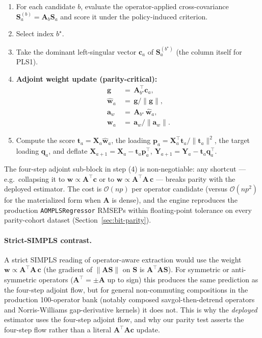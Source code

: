 \documentclass[review,a4paper]{elsarticle}
\newcommand{\Xmat}{\mathbf{X}}
\newcommand{\Ymat}{\mathbf{Y}}
\newcommand{\Amat}{\mathbf{A}}
\newcommand{\Smat}{\mathbf{S}}
\newcommand{\wvec}{\mathbf{w}}
\newcommand{\tvec}{\mathbf{t}}
\newcommand{\pvec}{\mathbf{p}}
\newcommand{\qvec}{\mathbf{q}}
\newcommand{\cvec}{\mathbf{c}}
\newcommand{\gvec}{\mathbf{g}}
\newcommand{\avec}{\mathbf{a}}
\newcommand{\SIMPLS}{\textsc{SIMPLS}\xspace}
\begin{document}
\begin{enumerate}[leftmargin=2em]
  \item For each candidate $b$, evaluate the operator-applied
        cross-covariance $\Smat_a^{(b)}=\Amat_b\Smat_a$ and score
        it under the policy-induced criterion.
  \item Select index $b^\star$.
  \item Take the dominant left-singular vector $\cvec_a$ of
        $\Smat_a^{(b^\star)}$ (the column itself for PLS1).
  \item \textbf{Adjoint weight update (parity-critical):}
        \begin{align*}
        \gvec      &\,=\, \Amat_{b^\star}^\top \cvec_a, \\
        \hat{\wvec}_a &\,=\, \gvec / \|\gvec\|, \\
        \avec_w    &\,=\, \Amat_{b^\star}\,\hat{\wvec}_a, \\
        \wvec_a    &\,=\, \avec_w / \|\avec_w\|.
        \end{align*}
  \item Compute the score $\tvec_a=\Xmat_a\hat{\wvec}_a$, the loading
        $\pvec_a=\Xmat_a^\top\tvec_a/\|\tvec_a\|^2$, the target loading
        $\qvec_a$, and deflate
        $\Xmat_{a+1}=\Xmat_a-\tvec_a\pvec_a^\top$,
        $\Ymat_{a+1}=\Ymat_a-\tvec_a\qvec_a^\top$.
\end{enumerate}
The four-step adjoint sub-block in step (4) is non-negotiable: any
shortcut --- e.g.\ collapsing it to $\wvec\propto\Amat^\top\cvec$ or to
$\wvec\propto\Amat^\top\Amat\,\cvec$ --- breaks parity with the deployed
estimator. The cost is $\mathcal{O}(np)$ per operator candidate (versus
$\mathcal{O}(np^2)$ for the materialized form when $\Amat$ is dense),
and the engine reproduces the production \verb|AOMPLSRegressor| RMSEPs
within floating-point tolerance on every parity-cohort dataset
(Section~\ref{sec:bit-parity}).

\paragraph{Strict-\SIMPLS contrast.}
A strict \SIMPLS reading of operator-aware extraction would use the
weight $\wvec\propto\Amat^\top\Amat\,\cvec$ (the gradient of
$\|\Amat\Smat\|$ on $\Smat$ is $\Amat^\top\Amat\Smat$). For symmetric or
anti-symmetric operators ($\Amat^\top\!=\pm\Amat$ up to sign) this
produces the same prediction as the four-step adjoint flow, but for
general non-commuting compositions in the production 100-operator bank
(notably composed savgol-then-detrend operators and Norris-Williams
gap-derivative kernels) it does not. This is why the \emph{deployed}
estimator uses the four-step adjoint flow, and why our parity test
asserts the four-step flow rather than a literal $\Amat^\top\Amat\cvec$
update.
\end{document}
